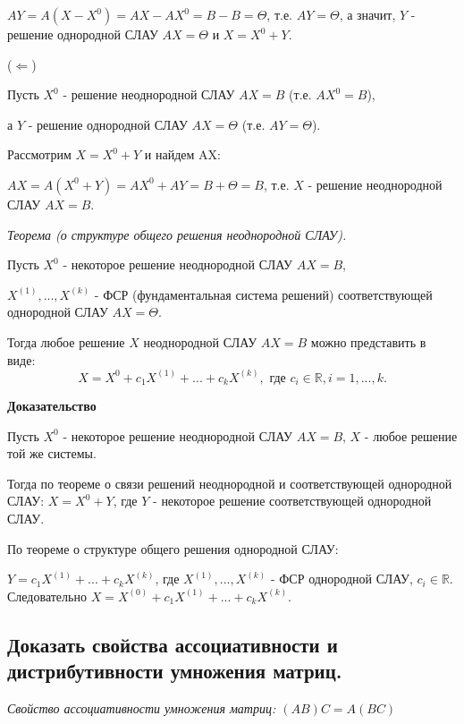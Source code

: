 $AY = A(X - X^0) = AX - AX^0 = B - B = \Theta$, т.е. $AY = \Theta$, а значит, $Y$ - решение однородной СЛАУ $AX = \Theta$ и $X = X^0 + Y$.

\vspace*{15pt}

($\Leftarrow$)  

Пусть $X^0$ - решение неоднородной СЛАУ $AX = B$ (т.е. $AX^0 = B$),

а $Y$ - решение однородной СЛАУ $AX = \Theta$ (т.е. $AY = \Theta$).

Рассмотрим $X = X^0 + Y$ и найдем AX:

$AX = A(X^0 + Y) = AX^0 + AY = B + \Theta = B$, т.е. $X$ - решение неоднородной СЛАУ $AX = B$.  

\ep


\textit {Теорема (о структуре общего решения неоднородной СЛАУ).} 

\vspace*{15pt}

Пусть $X^0$ - некоторое решение неоднородной СЛАУ $AX = B$,

$X^{(1)}, ..., X^{(k)}$ - ФСР (фундаментальная система решений) соответствующей однородной СЛАУ $AX = \Theta$.

Тогда любое решение $X$ неоднородной СЛАУ $AX = B$ можно представить в виде:
$$X = X^0 + c_1X^{(1)} + ... + c_kX^{(k)}, \text{ где } c_i \in \mathbb{R}, i = 1, ..., k.$$

{\bf {Доказательство}}

Пусть $X^0$ - некоторое решение неоднородной СЛАУ $AX = B$, $X$ - любое решение той же системы.

Тогда по теореме о связи решений неоднородной и соответствующей однородной СЛАУ:
$X = X^0 + Y$, где $Y$ - некоторое решение соответствующей однородной СЛАУ.

По теореме о структуре общего решения однородной СЛАУ:

$Y = c_1X^{(1)} + ... +  c_kX^{(k)}$, где $X^{(1)}, ..., X^{(k)}$ - ФСР однородной СЛАУ, $c_i \in \mathbb{R}$. Следовательно $X = X^{(0)} + c_1X^{(1)} + ... + c_kX^{(k)}$.  

\ep

\subsection{Доказать свойства ассоциативности и дистрибутивности умножения матриц. }

\textit {Свойство ассоциативности умножения матриц: $(AB)C = A(BC)$}


